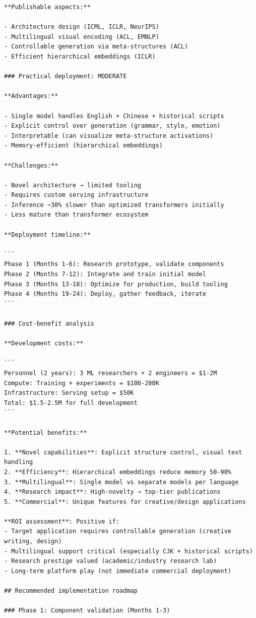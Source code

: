 \documentclass[11pt]{article}
\begin{document}
\begin{verbatim}
**Publishable aspects:**

- Architecture design (ICML, ICLR, NeurIPS)
- Multilingual visual encoding (ACL, EMNLP)
- Controllable generation via meta-structures (ACL)
- Efficient hierarchical embeddings (ICLR)

### Practical deployment: MODERATE

**Advantages:**

- Single model handles English + Chinese + historical scripts
- Explicit control over generation (grammar, style, emotion)
- Interpretable (can visualize meta-structure activations)
- Memory-efficient (hierarchical embeddings)

**Challenges:**

- Novel architecture → limited tooling
- Requires custom serving infrastructure
- Inference ~30% slower than optimized transformers initially
- Less mature than transformer ecosystem

**Deployment timeline:**

```
Phase 1 (Months 1-6): Research prototype, validate components
Phase 2 (Months 7-12): Integrate and train initial model  
Phase 3 (Months 13-18): Optimize for production, build tooling
Phase 4 (Months 19-24): Deploy, gather feedback, iterate
```

### Cost-benefit analysis

**Development costs:**

```
Personnel (2 years): 3 ML researchers + 2 engineers = $1-2M
Compute: Training + experiments = $100-200K
Infrastructure: Serving setup = $50K
Total: $1.5-2.5M for full development
```

**Potential benefits:**

1. **Novel capabilities**: Explicit structure control, visual text handling
2. **Efficiency**: Hierarchical embeddings reduce memory 50-90%
3. **Multilingual**: Single model vs separate models per language
4. **Research impact**: High-novelty → top-tier publications
5. **Commercial**: Unique features for creative/design applications

**ROI assessment**: Positive if:
- Target application requires controllable generation (creative writing, design)
- Multilingual support critical (especially CJK + historical scripts)
- Research prestige valued (academic/industry research lab)
- Long-term platform play (not immediate commercial deployment)

## Recommended implementation roadmap

### Phase 1: Component validation (Months 1-3)


\end{verbatim}
\end{document}
